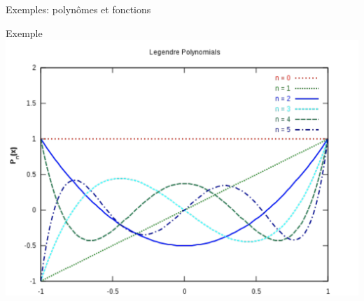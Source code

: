 \begin{parag}{Exemples: polynômes et fonctions}
\begin{subparag}{Exemple}
                \includegraphics[scale = 0.5]{Algèbre linéaire/Screenshot 2024-12-10 163537.png}
                
            \end{subparag}
            
        \end{parag}

